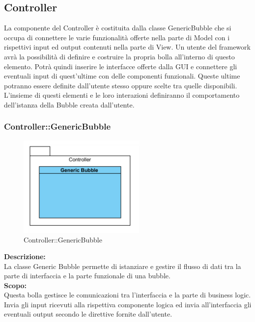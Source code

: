 \subsection{Controller}
La componente del Controller è costituita dalla classe Generic\-Bubble che si occupa di connettere le varie funzionalità offerte nella parte di Model con i rispettivi input ed output contenuti nella parte di View. Un utente del framework avrà la possibilità di definire e costruire la propria bolla all’interno di questo elemento. Potrà quindi inserire le interfacce offerte dalla GUI e connettere gli eventuali input di quest’ultime con delle componenti funzionali. Queste ultime potranno essere definite dall’utente stesso oppure scelte tra quelle disponibili. 
L’insieme di questi elementi e le loro interazioni definiranno il comportamento dell’istanza della Bubble creata dall’utente.
\begin{samepage}
\subsubsection{Controller\-::Generic\-Bubble}\label{fm-generica}
\nopagebreak
\begin{figure}[H]
	\centering
	\includegraphics[height=5cm]{diagrammi_img/classi_e_package/bubble_generica.png}
	\caption{Controller\-::Generic\-Bubble}
\end{figure}
\end{samepage}
\textbf{Descrizione:}\\
La classe Generic Bubble permette di istanziare e gestire il flusso di dati tra la parte di interfaccia e la parte funzionale di una bubble.\\
\textbf{Scopo:}\\
Questa bolla gestisce le comunicazioni tra l’interfaccia e la parte di business logic. Invia gli input ricevuti alla rispettiva componente logica ed invia all’interfaccia gli eventuali output secondo le direttive fornite dall’utente.


